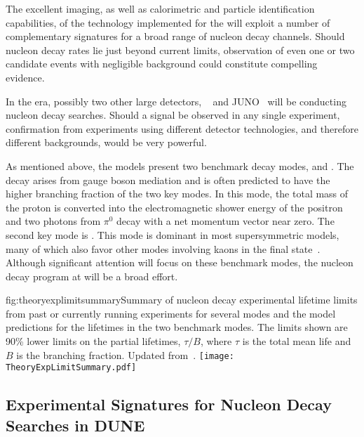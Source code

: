 The excellent imaging, as well as calorimetric and particle identification capabilities, of the  technology  implemented for the   will exploit a number of complementary signatures for a broad range of nucleon decay channels.  Should nucleon decay rates lie just beyond current limits, observation of even one or two candidate events with negligible background could constitute compelling evidence.

In the  era, possibly two other large detectors, \hyperk~\cite{Abe:2018uyc} and JUNO~\cite{Djurcic:2015vqa} will be conducting nucleon decay searches. Should a signal be observed in any single experiment, confirmation from experiments using different detector technologies, and therefore different backgrounds, would be very powerful.

As mentioned above, the  models present two benchmark decay modes, \ptoepizero and \ptoknubar.  The decay \ptoepizero arises from gauge boson mediation and is often predicted to have the higher branching fraction of the two key modes. In this mode, the total mass of the proton is converted into the electromagnetic shower energy of the positron and two photons from $\pi^0$ decay with a net momentum vector near zero. 
The second key mode is \ptoknubar. This mode is dominant in most supersymmetric  models,
many of which also favor other modes involving kaons in the final state~\cite{Dimopoulos:1981dw}.
Although significant attention will focus on these benchmark modes, the nucleon decay program at  will be a broad effort.

\begin{dunefigure}{fig:theoryexplimitsummary}{Summary of nucleon decay experimental lifetime limits from past or currently running experiments for several modes and the model predictions for the lifetimes in the two benchmark modes.  The limits shown are 90\%  lower limits on the partial lifetimes, $\tau/B$, where $\tau$ is the total mean life and $B$ is the branching fraction. Updated from~\cite{Babu:2013jba}.}
\texttt{[image: TheoryExpLimitSummary.pdf]}
\end{dunefigure}

\subsection{Experimental Signatures for Nucleon Decay Searches in DUNE}
\label{subsec:nonaccel-ndk-dune}

